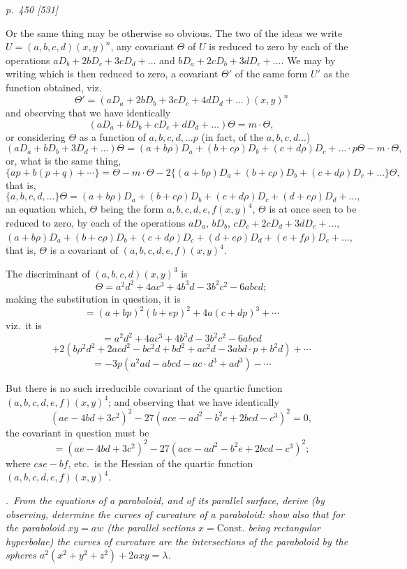 \documentclass[11pt,a4paper]{book}
\begin{document}
\clearpage

\bigskip
\textit{p.~450 [531]}
\smallskip

Or the same thing may be otherwise so obvious. The two of the ideas we write
$U = (a, b, c, d)(x, y)^n$, any covariant $\Theta$ of $U$ is reduced to zero by each of the
operations $aD_b + 2bD_c + 3cD_d + \ldots$ and $bD_a + 2cD_b + 3dD_c + \ldots$. We may by writing
which is then reduced to zero, a covariant $\Theta'$ of the same form $U'$ as the function obtained, viz.\
\[
\Theta' = (aD_a + 2bD_b + 3cD_c + 4dD_d + \ldots)(x, y)^n
\]
and observing that we have identically
\[
(aD_a + bD_b + cD_c + dD_d + \ldots)\Theta = m \cdot \Theta,
\]
or considering $\Theta$ as a function of $a, b, c, d, \ldots p$ (in fact, of the $a, b, c, d \ldots$)
\[
(aD_a + bD_b + 3D_d + \ldots)\Theta = (a + b\rho)D_a + (b + c\rho)D_b + (c + d\rho)D_c + \ldots \cdot p\Theta - m \cdot \Theta,
\]
or, what is the same thing,
\[
\{ap + b(p + q) + \cdots\} = \Theta - m \cdot \Theta - 2\{(a + b\rho)D_a + (b + c\rho)D_b + (c + d\rho)D_c + \ldots\}\Theta,
\]
that is,
\[
\{a, b, c, d, \ldots\}\Theta = (a + b\rho)D_a + (b + c\rho)D_b + (c + d\rho)D_c + (d + e\rho)D_d + \ldots,
\]
an equation which, $\Theta$ being the form ${a, b, c, d, e, f}(x, y)^4$, $\Theta$ is at once seen to be reduced to zero, by each of the operations $aD_a$, $bD_b$, $cD_c + 2cD_d + 3dD_e + \ldots$, $(a + b\rho)D_a + (b + c\rho)D_b + (c + d\rho)D_c + (d + e\rho)D_d + (e + f\rho)D_e + \ldots$, that is, $\Theta$ is a covariant of $(a, b, c, d, e, f)(x, y)^4$.

The discriminant of $(a, b, c, d)(x, y)^3$ is
\[
\Theta = a^2 d^2 + 4ac^3 + 4b^3 d - 3b^2c^2 - 6abcd;
\]
making the substitution in question, it is
\[
= (a + bp)^2 (b + ep)^2 + 4a(c + dp)^3 + \cdots
\]
viz.\ it is
\[
= a^2 d^2 + 4ac^3 + 4b^3 d - 3b^2 c^2 - 6abcd
\]
\[
+ 2(b\rho^2 d^2 + 2acd^2 - bc^2 d + bd^2 + a c^2 d - 3 abd \cdot p + b^2 d) + \cdots
\]
\[
= -3p(a^2 ad - abcd - ac\cdot d^3 + ad^3) - \cdots
\]

But there is no such irreducible covariant of the quartic function $(a, b, c, d, e, f)(x, y)^4$;
and observing that we have identically
\[
(ae - 4bd + 3c^2)^2 - 27(ace - ad^2 - b^2 e + 2bcd - c^3)^2 = 0,
\]
the covariant in question must be
\[
= (ae - 4bd + 3c^2)^2 - 27(ace - ad^2 - b^2 e + 2bcd - c^3)^2;
\]
where $cse - bf$, etc.\ is the Hessian of the quartic function $(a, b, c, d, e, f)(x, y)^4$.

\medskip
{}.\ \textit{From the equations of a paraboloid, and of its parallel surface, derive (by observing,
determine the curves of curvature of a paraboloid: show also that for the paraboloid $xy = aw$
(the parallel sections $x = \text{Const}.$ being rectangular hyperbolae) the curves of curvature are
the intersections of the paraboloid by the spheres $a^2(x^2 + y^2 + z^2) + 2axy = \lambda$.}
\end{document}
